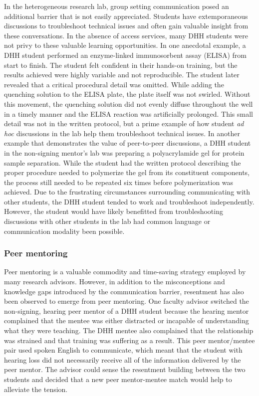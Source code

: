 \documentclass[11.5pt]{sig-alternate} %
\begin{document}
\begin{large}
In the heterogeneous research lab, group setting communication posed an additional barrier that is not easily appreciated. Students have extemporaneous discussions to troubleshoot technical issues and often gain valuable insight from these conversations. In the absence of access services, many DHH students were not privy to these valuable learning opportunities. In one anecdotal example, a DHH student performed an enzyme-linked immunosorbent assay (ELISA) from start to finish. The student felt confident in their hands-on training, but the results achieved were highly variable and not reproducible. The student later revealed that a critical procedural detail was omitted. While adding the quenching solution to the ELISA plate, the plate itself was not swirled. Without this movement, the quenching solution did not evenly diffuse throughout the well in a timely manner and the ELISA reaction was artificially prolonged. This small detail was not in the written protocol, but a prime example of how student \textit{ad hoc} discussions in the lab help them troubleshoot technical issues. In another example that demonstrates the value of peer-to-peer discussions, a DHH student in the non-signing mentor’s lab was preparing a polyacrylamide gel for protein sample separation. While the student had the written protocol describing the proper procedure needed to polymerize the gel from its constituent components, the process still needed to be repeated six times before polymerization was achieved. Due to the frustrating circumstances surrounding communicating with other students, the DHH student tended to work and troubleshoot independently. However, the student would have likely benefitted from troubleshooting discussions with other students in the lab had common language or communication modality been possible.

\subsubsection*{Peer mentoring} Peer mentoring is a valuable commodity and time-saving strategy employed by many research advisors. However, in addition to the misconceptions and knowledge gaps introduced by the communication barrier, resentment has also been observed to emerge from peer mentoring. One faculty advisor switched the non-signing, hearing peer mentor of a DHH student because the hearing mentor complained that the mentee was either distracted or incapable of understanding what they were teaching. The DHH mentee also complained that the relationship was strained and that training was suffering as a result. This peer mentor/mentee pair used spoken English to communicate, which meant that the student with hearing loss did not necessarily receive all of the information delivered by the peer mentor. The advisor could sense the resentment building between the two students and decided that a new peer mentor-mentee match would help to alleviate the tension.   


\end{large}
\end{document}
